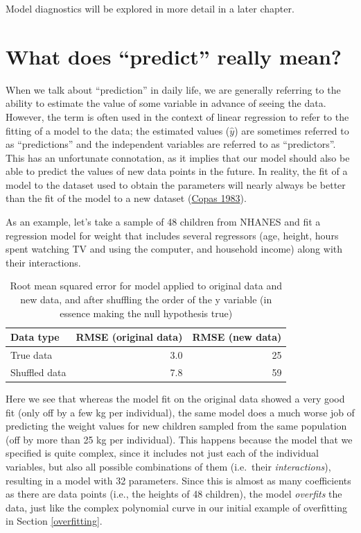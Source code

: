 \documentclass[
  12pt,
]{book}
\begin{document}
Model diagnostics will be explored in more detail in a later chapter.

\hypertarget{what-does-predict-really-mean}{%
\section{What does ``predict'' really mean?}\label{what-does-predict-really-mean}}

When we talk about ``prediction'' in daily life, we are generally referring to the ability to estimate the value of some variable in advance of seeing the data. However, the term is often used in the context of linear regression to refer to the fitting of a model to the data; the estimated values (\(\hat{y}\)) are sometimes referred to as ``predictions'' and the independent variables are referred to as ``predictors''. This has an unfortunate connotation, as it implies that our model should also be able to predict the values of new data points in the future. In reality, the fit of a model to the dataset used to obtain the parameters will nearly always be better than the fit of the model to a new dataset (\protect\hyperlink{ref-copa:1983}{Copas 1983}).

As an example, let's take a sample of 48 children from NHANES and fit a regression model for weight that includes several regressors (age, height, hours spent watching TV and using the computer, and household income) along with their interactions.

\begin{table}

\caption{\label{tab:unnamed-chunk-86}Root mean squared error for model applied to original data and new data, and after shuffling the order of the y variable (in essence making the null hypothesis true)}
\centering
\begin{tabular}[t]{l|r|r}
\hline
Data type & RMSE (original data) & RMSE (new data)\\
\hline
True data & 3.0 & 25\\
\hline
Shuffled data & 7.8 & 59\\
\hline
\end{tabular}
\end{table}

Here we see that whereas the model fit on the original data showed a very good fit (only off by a few kg per individual), the same model does a much worse job of predicting the weight values for new children sampled from the same population (off by more than 25 kg per individual). This happens because the model that we specified is quite complex, since it includes not just each of the individual variables, but also all possible combinations of them (i.e.~their \emph{interactions}), resulting in a model with 32 parameters. Since this is almost as many coefficients as there are data points (i.e., the heights of 48 children), the model \emph{overfits} the data, just like the complex polynomial curve in our initial example of overfitting in Section \ref{overfitting}.
\end{document}
